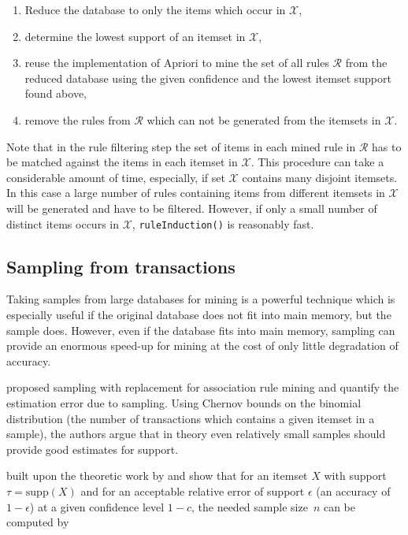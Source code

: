 \documentclass[10pt,a4paper]{article}
\newcommand{\func}[1]{\mbox{\texttt{#1()}}}
\newcommand{\set}[1]{\mathcal{#1}}
\begin{document}
\begin{enumerate}
 \item Reduce the database to only the items which occur in $\set{X}$,
 \item determine the lowest support of an itemset in $\set{X}$,
 \item reuse the implementation of Apriori to mine the set of all rules
  $\set{R}$ from the reduced database using the given confidence and the
  lowest itemset support found above,
 \item remove the rules from $\set{R}$ which can not be generated from
  the itemsets in $\set{X}$.
\end{enumerate}

Note that in the rule filtering step the set of items in each mined rule
in $\set{R}$ has to be matched against the items in each itemset in
$\set{X}$.  This procedure can take a considerable amount of time,
especially, if set $\set{X}$ contains many disjoint itemsets.  In this
case a large number of rules containing items from different itemsets in
$\set{X}$ will be generated and have to be filtered.  However, if only a
small number of distinct items occurs in $\set{X}$, \func{ruleInduction}
is reasonably fast.


\subsection{Sampling from transactions\label{sec:sample}}

Taking samples from large databases for mining is a powerful technique
which is especially useful if the original database does not fit into
main memory, but the sample does.  However, even if the database fits
into main memory, sampling can provide an enormous speed-up for mining
at the cost of only little degradation of accuracy.

\cite{arules:Mannila+Toivonen+Verkamo:1994}
proposed sampling with replacement for association rule mining
and quantify the estimation error due to sampling.
Using Chernov bounds on the binomial distribution (the number of
transactions which contains a given itemset in a sample),
the authors argue that in theory even relatively small samples 
should provide good estimates for support.

\cite{arules:Zaki+Parthasarathy+Li+Ogihara:1997} built upon the
theoretic work by \cite{arules:Mannila+Toivonen+Verkamo:1994} and show
that for an itemset $X$ with support $\tau = \mathrm{supp}(X)$ and for
an acceptable relative error of support $\epsilon$ (an accuracy of $1 -
\epsilon$) at a given confidence level $1-c$, the needed sample size~$n$
can be computed by
\end{document}
